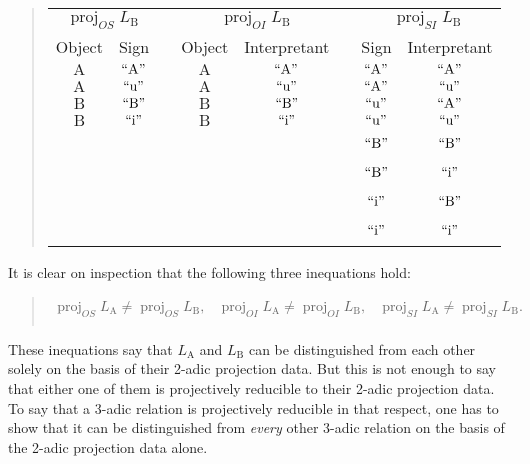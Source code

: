 \documentclass[12pt]{article}
\begin{document}
\begin{quote}\begin{tabular}{|c|c|p{1cm}|c|c|p{1cm}|c|c|}
\multicolumn{2}{c}{$\operatorname{proj}_{OS}L_{\mathrm{B}}$} &
\multicolumn{1}{c}{ } &
\multicolumn{2}{c}{$\operatorname{proj}_{OI}L_{\mathrm{B}}$} &
\multicolumn{1}{c}{ } &
\multicolumn{2}{c}{$\operatorname{proj}_{SI}L_{\mathrm{B}}$} \\
\cline{1-2}\cline{4-5}\cline{7-8}
Object & Sign & & Object & Interpretant & & Sign & Interpretant \\
\cline{1-2}\cline{4-5}\cline{7-8}
$\mathrm{A}$ & $\mathrm{``A"}$ & &
$\mathrm{A}$ & $\mathrm{``A"}$ & &
$\mathrm{``A"}$ & $\mathrm{``A"}$ \\
\cline{1-2}\cline{4-5}\cline{7-8}
$\mathrm{A}$ & $\mathrm{``u"}$ & &
$\mathrm{A}$ & $\mathrm{``u"}$ & &
$\mathrm{``A"}$ & $\mathrm{``u"}$ \\
\cline{1-2}\cline{4-5}\cline{7-8}
$\mathrm{B}$ & $\mathrm{``B"}$ & &
$\mathrm{B}$ & $\mathrm{``B"}$ & &
$\mathrm{``u"}$ & $\mathrm{``A"}$ \\
\cline{1-2}\cline{4-5}\cline{7-8}
$\mathrm{B}$ & $\mathrm{``i"}$ & &
$\mathrm{B}$ & $\mathrm{``i"}$ & &
$\mathrm{``u"}$ & $\mathrm{``u"}$ \\
\cline{1-2}\cline{4-5}\cline{7-8}
\multicolumn{6}{c|}{~} & $\mathrm{``B"}$ & $\mathrm{``B"}$ \\
\cline{7-8}
\multicolumn{6}{c|}{~} & $\mathrm{``B"}$ & $\mathrm{``i"}$ \\
\cline{7-8}
\multicolumn{6}{c|}{~} & $\mathrm{``i"}$ & $\mathrm{``B"}$ \\
\cline{7-8}
\multicolumn{6}{c|}{~} & $\mathrm{``i"}$ & $\mathrm{``i"}$ \\
\cline{7-8}
\end{tabular}\end{quote}

It is clear on inspection that the following three inequations hold:

\begin{quote}$\begin{array}{lcr}
\operatorname{proj}_{OS}L_{\mathrm{A}} \ne \operatorname{proj}_{OS}L_{\mathrm{B}}, &
\operatorname{proj}_{OI}L_{\mathrm{A}} \ne \operatorname{proj}_{OI}L_{\mathrm{B}}, &
\operatorname{proj}_{SI}L_{\mathrm{A}} \ne \operatorname{proj}_{SI}L_{\mathrm{B}}. \\
\end{array}$\end{quote}

These inequations say that $L_{\mathrm{A}}$ and $L_{\mathrm{B}}$ can be distinguished from each other solely on the basis of their 2-adic projection data.  But this is not enough to say that either one of them is projectively reducible to their 2-adic projection data.  To say that a 3-adic relation is projectively reducible in that respect, one has to show that it can be distinguished from \textit{every} other 3-adic relation on the basis of the 2-adic projection data alone.
\end{document}
